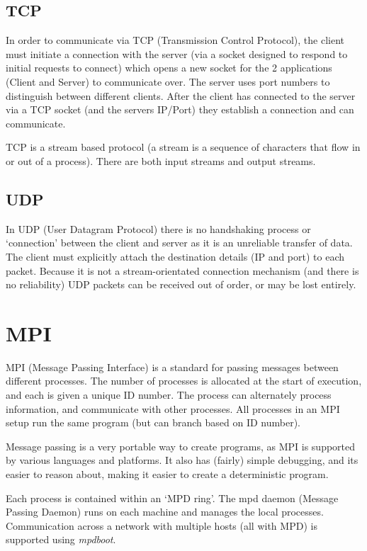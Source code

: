 \documentclass{article}
\begin{document}
\subsection{TCP}
In order to communicate via TCP (Transmission Control Protocol), the client must initiate a connection with the server (via a socket designed to respond to initial requests to connect) which opens a new socket for the 2 applications (Client and Server) to communicate over. The server uses port numbers to distinguish between different clients. After the client has connected to the server via a TCP socket (and the servers IP/Port) they establish a connection and can communicate.

TCP is a stream based protocol (a stream is a sequence of characters that flow in or out of a process). There are both input streams and output streams. 

\subsection{UDP}
In UDP (User Datagram Protocol) there is no handshaking process or `connection' between the client and server as it is an unreliable transfer of data. The client must explicitly attach the destination details (IP and port) to each packet. Because it is not a stream-orientated connection mechanism (and there is no reliability) UDP packets can be received out of order, or may be lost entirely.

\section{MPI}
MPI (Message Passing Interface) is a standard for passing messages between different processes. The number of processes is allocated at the start of execution, and each is given a unique ID number. The process can alternately process information, and communicate with other processes. All processes in an MPI setup run the same program (but can branch based on ID number). 

Message passing is a very portable way to create programs, as MPI is supported by various languages and platforms. It also has (fairly) simple debugging, and its easier to reason about, making it easier to create a deterministic program. 

Each process is contained within an `MPD ring'. The mpd daemon (Message Passing Daemon) runs on each machine and manages the local processes. Communication across a network with multiple hosts (all with MPD) is supported using \textit{mpdboot}.
\end{document}
